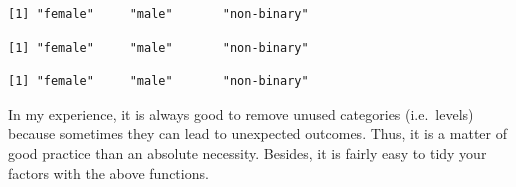 \documentclass[
  letterpaper,
]{krantz}
\makeatletter
\newenvironment{Shaded}{\begin{snugshade}}{\end{snugshade}}
\newcommand{\AttributeTok}[1]{\textcolor[rgb]{0.40,0.45,0.13}{#1}}
\newcommand{\CommentTok}[1]{\textcolor[rgb]{0.37,0.37,0.37}{#1}}
\newcommand{\FunctionTok}[1]{\textcolor[rgb]{0.28,0.35,0.67}{#1}}
\newcommand{\NormalTok}[1]{\textcolor[rgb]{0.00,0.23,0.31}{#1}}
\newcommand{\OtherTok}[1]{\textcolor[rgb]{0.00,0.23,0.31}{#1}}
\newcommand{\SpecialCharTok}[1]{\textcolor[rgb]{0.37,0.37,0.37}{#1}}
\newenvironment{kframe}{%
\medskip{}
\setlength{\fboxsep}{.8em}
 \def\at@end@of@kframe{}%
 \ifinner\ifhmode%
  \def\at@end@of@kframe{\end{minipage}}%
  \begin{minipage}{\columnwidth}%
 \fi\fi%
 \def\FrameCommand##1{\hskip\@totalleftmargin \hskip-\fboxsep
 \colorbox{shadecolor}{##1}\hskip-\fboxsep
     \hskip-\linewidth \hskip-\@totalleftmargin \hskip\columnwidth}%
 \MakeFramed {\advance\hsize-\width
   \@totalleftmargin\z@ \linewidth\hsize
   \@setminipage}}%
 {\par\unskip\endMakeFramed%
 \at@end@of@kframe}
\renewenvironment{Shaded}{\begin{kframe}}{\end{kframe}}
\makeatother
\begin{document}
\begin{Shaded}
\end{Shaded}

\begin{verbatim}
[1] "female"     "male"       "non-binary"
\end{verbatim}

\begin{Shaded}
\end{Shaded}

\begin{verbatim}
[1] "female"     "male"       "non-binary"
\end{verbatim}

\begin{Shaded}
\end{Shaded}

\begin{verbatim}
[1] "female"     "male"       "non-binary"
\end{verbatim}

In my experience, it is always good to remove unused categories
(i.e.~levels) because sometimes they can lead to unexpected outcomes.
Thus, it is a matter of good practice than an absolute necessity.
Besides, it is fairly easy to tidy your factors with the above
functions.
\end{document}
